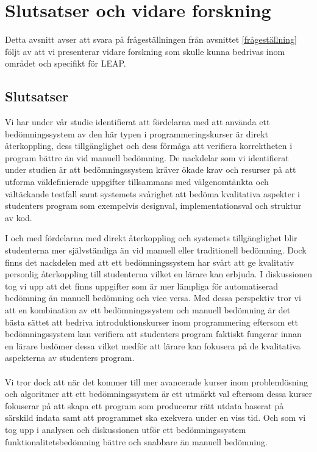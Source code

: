 \documentclass[a4paper,11pt]{article}
\begin{document}
{\newpage
\section{Slutsatser och vidare forskning}

Detta avsnitt avser att svara på frågeställningen från avsnittet \ref{frågeställning} följt av att vi presenterar vidare forskning som skulle kunna bedrivas inom området och specifikt för LEAP.




\subsection{Slutsatser}

Vi har under vår studie identifierat att fördelarna med att använda ett bedömningssystem av den här typen i programmeringskurser är direkt återkoppling, dess tillgänglighet och dess förmåga att verifiera korrektheten i program bättre än vid manuell bedömning. De nackdelar som vi identifierat under studien är att bedömningssystem kräver ökade krav och resurser på att utforma väldefinierade uppgifter tillsammans med välgenomtänkta och vältäckande testfall samt systemets svårighet att bedöma kvalitativa aspekter i studenters program som exempelvis designval, implementationsval och struktur av kod.

I och med fördelarna med direkt återkoppling och systemets tillgänglighet blir studenterna mer självständiga än vid manuell eller traditionell bedömning. Dock finns det nackdelen med att ett bedömningssystem har svårt att ge kvalitativ personlig återkoppling till studenterna vilket en lärare kan erbjuda. I diskussionen tog vi upp att det finns uppgifter som är mer lämpliga för automatiserad bedömning än manuell bedömning och vice versa. Med dessa perspektiv tror vi att en kombination av ett bedömningssystem och manuell bedömning är det bästa sättet att bedriva introduktionskurser inom programmering eftersom ett bedömningssystem kan verifiera att studenters program faktiskt fungerar innan en lärare bedömer dessa vilket medför att lärare kan fokusera på de kvalitativa aspekterna av studenters program.
\\
\\
Vi tror dock att när det kommer till mer avancerade kurser inom problemlösning och algoritmer att ett bedömningssystem är ett utmärkt val eftersom dessa kurser fokuserar på att skapa ett program som producerar rätt utdata baserat på särskild indata samt att programmet ska exekvera under en viss tid. Och som vi tog upp i analysen och diskussionen utför ett bedömningssystem funktionalitetsbedömning bättre och snabbare än manuell bedömning.

}
\end{document}
